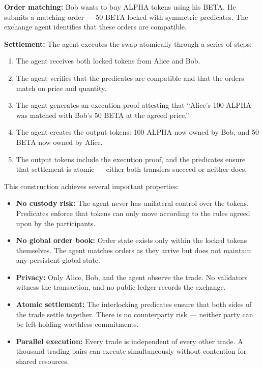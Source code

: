 \documentclass{article}
\begin{document}
\textbf{Order matching:} Bob wants to buy ALPHA tokens using his BETA. He submits a matching order --- 50 BETA locked with symmetric predicates. The exchange agent identifies that these orders are compatible.

\textbf{Settlement:} The agent executes the swap atomically through a series of steps:

\begin{enumerate}
    \item The agent receives both locked tokens from Alice and Bob.

    \item The agent verifies that the predicates are compatible and that the orders match on price and quantity.

    \item The agent generates an execution proof attesting that ``Alice's 100 ALPHA was matched with Bob's 50 BETA at the agreed price.''

    \item The agent creates the output tokens: 100 ALPHA now owned by Bob, and 50 BETA now owned by Alice.

    \item The output tokens include the execution proof, and the predicates ensure that settlement is atomic --- either both transfers succeed or neither does.
\end{enumerate}

This construction achieves several important properties:

\begin{itemize}
    \item \textbf{No custody risk:}
    The agent never has unilateral control over the tokens. Predicates enforce that tokens can only move according to the rules agreed upon by the participants.

    \item \textbf{No global order book:}
    Order state exists only within the locked tokens themselves. The agent matches orders as they arrive but does not maintain any persistent global state.

    \item \textbf{Privacy:}
    Only Alice, Bob, and the agent observe the trade. No validators witness the transaction, and no public ledger records the exchange.

    \item \textbf{Atomic settlement:}
    The interlocking predicates ensure that both sides of the trade settle together. There is no counterparty risk --- neither party can be left holding worthless commitments.

    \item \textbf{Parallel execution:}
    Every trade is independent of every other trade. A thousand trading pairs can execute simultaneously without contention for shared resources.
\end{itemize}
\end{document}

